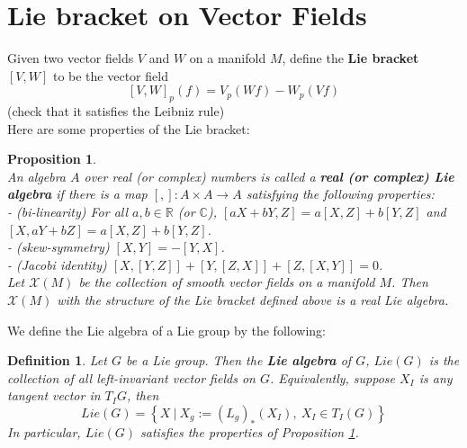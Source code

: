 \documentclass[11pt]{book}
\newtheorem{proposition}[theorem]{Proposition}
\newtheorem{definition}[theorem]{Definition}
\newcommand{\bb}[1]{\mathbb{#1}}
\newcommand{\mc}[1]{\mathcal{#1}}
\begin{document}
\section{Lie bracket on Vector Fields}
Given two vector fields $V$ and $W$ on a manifold $M$, define the \textbf{Lie bracket} $[V,W]$ to be the vector field
$$[V,W]_p(f) = V_p (Wf) - W_p(Vf)$$
(check that it satisfies the Leibniz rule)\\
Here are some properties of the Lie bracket:
\begin{proposition}\label{liebracket} \mbox{}\\
An algebra $A$ over real (or complex) numbers is called a \textbf{real (or complex) Lie algebra} if there is a map $[,]: A \times A \to A$ satisfying the following properties:\\
- (bi-linearity) For all $a, b \in \bb{R}$ (or $\bb{C}$), $[aX+bY, Z] = a[X,Z] + b[Y,Z]$ and $[X,aY+bZ] = a[X,Z]+b[Y,Z]$.\\
- (skew-symmetry) $[X,Y] = -[Y,X]$.\\
- (Jacobi identity) $[X,[Y,Z]]+[Y,[Z,X]]+[Z,[X,Y]] = 0$.\\

\noindent Let $\mc{X}(M)$ be the collection of smooth vector fields on a manifold $M$. Then $\mc{X}(M)$ with the structure of the Lie bracket defined above is a real Lie algebra.
\end{proposition}
We define the Lie algebra of a Lie group by the following:
\begin{definition}
Let $G$ be a Lie group. Then the \textbf{Lie algebra} of $G$, $Lie(G)$ is the collection of all left-invariant vector fields on $G$. Equivalently, suppose $X_I$ is any tangent vector in $T_IG$, then
$$Lie(G) = \left\{ X\ \Big|\ X_g:=(L_g)_*(X_I),\ X_I \in T_I(G) \right\}$$
In particular, $Lie(G)$ satisfies the properties of Proposition \ref{liebracket}.
\end{definition}
\end{document}

